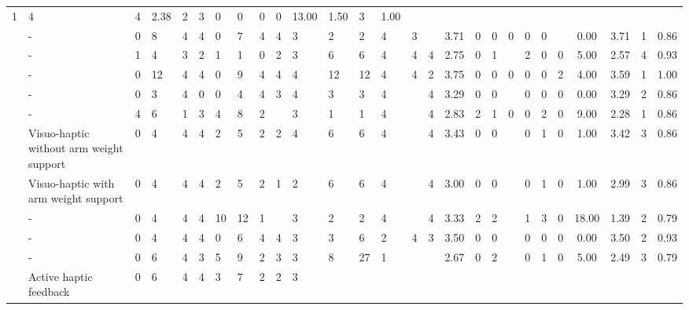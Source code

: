 \begin{table}[htbp]
\begin{tabular}{lp{4cm}lllllllllllllllllllllcccc}
  1 &
  4 &
  4 &
  2.38 &
  2 &
  3 &
  0 &
  0 &
  0 &
  0 &
  13.00 &
  1.50 &
  3 &
  1.00 \\
\cite{Macuga2019} &
  - &
  0 &
  8 &
  4 &
  4 &
  0 &
  7 &
  4 &
  4 &
  3 &
  2 &
  2 &
  4 &
  3 &
   &
  3.71 &
  0 &
  0 &
  0 &
  0 &
  0 &
   &
  0.00 &
  3.71 &
  1 &
  0.86 \\
\cite{McAnally2023} &
  - &
  1 &
  4 &
  3 &
  2 &
  1 &
  1 &
  0 &
  2 &
  3 &
  6 &
  6 &
  4 &
  4 &
  4 &
  2.75 &
  0 &
  1 &
   &
  2 &
  0 &
  0 &
  5.00 &
  2.57 &
  4 &
  0.93 \\
\cite{Mohanty2023} &
  - &
  0 &
  12 &
  4 &
  4 &
  0 &
  9 &
  4 &
  4 &
  4 &
  12 &
  12 &
  4 &
  4 &
  2 &
  3.75 &
  0 &
  0 &
  0 &
  0 &
  0 &
  2 &
  4.00 &
  3.59 &
  1 &
  1.00 \\
\cite{Morris2007} &
  - &
  0 &
  3 &
  4 &
  0 &
  0 &
  4 &
  4 &
  3 &
  4 &
  3 &
  3 &
  4 &
   &
  4 &
  3.29 &
  0 &
  0 &
   &
  0 &
  0 &
  0 &
  0.00 &
  3.29 &
  2 &
  0.86 \\
\cite{Najdovski2020} &
  - &
  4 &
  6 &
  1 &
  3 &
  4 &
  8 &
  2 &
   &
  3 &
  1 &
  1 &
  4 &
   &
  4 &
  2.83 &
  2 &
  1 &
  0 &
  0 &
  2 &
  0 &
  9.00 &
  2.28 &
  1 &
  0.86 \\
\cite{Oezen2022} &
  Visuo-haptic without arm weight support &
  0 &
  4 &
  4 &
  4 &
  2 &
  5 &
  2 &
  2 &
  4 &
  6 &
  6 &
  4 &
   &
  4 &
  3.43 &
  0 &
  0 &
   &
  0 &
  1 &
  0 &
  1.00 &
  3.42 &
  3 &
  0.86 \\
\cite{Oezen2022} &
  Visuo-haptic with arm weight support &
  0 &
  4 &
  4 &
  4 &
  2 &
  5 &
  2 &
  1 &
  2 &
  6 &
  6 &
  4 &
   &
  4 &
  3.00 &
  0 &
  0 &
   &
  0 &
  1 &
  0 &
  1.00 &
  2.99 &
  3 &
  0.86 \\
\cite{Perez2023} &
  - &
  0 &
  4 &
  4 &
  4 &
  10 &
  12 &
  1 &
   &
  3 &
  2 &
  2 &
  4 &
   &
  4 &
  3.33 &
  2 &
  2 &
   &
  1 &
  3 &
  0 &
  18.00 &
  1.39 &
  2 &
  0.79 \\
\cite{Rodriguez2010} &
  - &
  0 &
  4 &
  4 &
  4 &
  0 &
  6 &
  4 &
  4 &
  3 &
  3 &
  6 &
  2 &
  4 &
  3 &
  3.50 &
  0 &
  0 &
   &
  0 &
  0 &
  0 &
  0.00 &
  3.50 &
  2 &
  0.93 \\
\cite{Trinitatova2023} &
  - &
  0 &
  6 &
  4 &
  3 &
  5 &
  9 &
  2 &
  3 &
  3 &
  8 &
  27 &
  1 &
   &
   &
  2.67 &
  0 &
  2 &
   &
  0 &
  1 &
  0 &
  5.00 &
  2.49 &
  3 &
  0.79 \\
\cite{Vaghela2021} &
  Active haptic feedback &
  0 &
  6 &
  4 &
  4 &
  3 &
  7 &
  2 &
  2 &
  3 &

\end{tabular}
\end{table}
